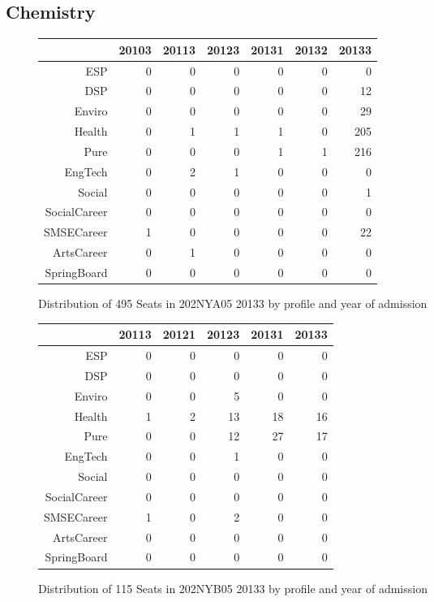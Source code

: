 \documentclass{article}\usepackage[]{graphicx}\usepackage[]{color}
\begin{document}
\subsection{Chemistry}
\begin{figure}[H]
\centering
\begin{tabular}{rrrrrrr}
  \hline
 & 20103 & 20113 & 20123 & 20131 & 20132 & 20133 \\ 
  \hline
ESP &   0 &   0 &   0 &   0 &   0 &   0 \\ 
  DSP &   0 &   0 &   0 &   0 &   0 &  12 \\ 
  Enviro &   0 &   0 &   0 &   0 &   0 &  29 \\ 
  Health &   0 &   1 &   1 &   1 &   0 & 205 \\ 
  Pure &   0 &   0 &   0 &   1 &   1 & 216 \\ 
  EngTech &   0 &   2 &   1 &   0 &   0 &   0 \\ 
  Social &   0 &   0 &   0 &   0 &   0 &   1 \\ 
  SocialCareer &   0 &   0 &   0 &   0 &   0 &   0 \\ 
  SMSECareer &   1 &   0 &   0 &   0 &   0 &  22 \\ 
  ArtsCareer &   0 &   1 &   0 &   0 &   0 &   0 \\ 
  SpringBoard &   0 &   0 &   0 &   0 &   0 &   0 \\ 
   \hline
\end{tabular}
\caption{Distribution of 495 Seats in 202NYA05 20133 by profile and year of admission} 
\end{figure}
\begin{figure}[H]
\centering
\begin{tabular}{rrrrrr}
  \hline
 & 20113 & 20121 & 20123 & 20131 & 20133 \\ 
  \hline
ESP &   0 &   0 &   0 &   0 &   0 \\ 
  DSP &   0 &   0 &   0 &   0 &   0 \\ 
  Enviro &   0 &   0 &   5 &   0 &   0 \\ 
  Health &   1 &   2 &  13 &  18 &  16 \\ 
  Pure &   0 &   0 &  12 &  27 &  17 \\ 
  EngTech &   0 &   0 &   1 &   0 &   0 \\ 
  Social &   0 &   0 &   0 &   0 &   0 \\ 
  SocialCareer &   0 &   0 &   0 &   0 &   0 \\ 
  SMSECareer &   1 &   0 &   2 &   0 &   0 \\ 
  ArtsCareer &   0 &   0 &   0 &   0 &   0 \\ 
  SpringBoard &   0 &   0 &   0 &   0 &   0 \\ 
   \hline
\end{tabular}
\caption{Distribution of 115 Seats in 202NYB05 20133 by profile and year of admission} 
\end{figure}
\end{document}
